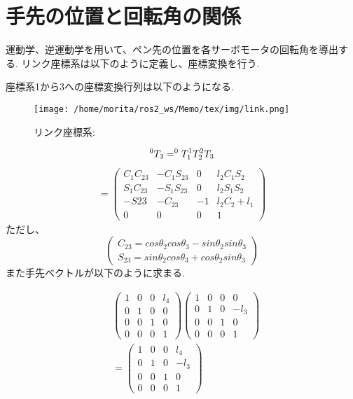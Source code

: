 \documentclass[10pt]{jarticle}
\begin{document}
	\section{手先の位置と回転角の関係}
	運動学、逆運動学を用いて、ペン先の位置を各サーボモータの回転角を導出する.
	リンク座標系は以下のように定義し、座標変換を行う.
	
	座標系1から3への座標変換行列は以下のようになる.
    \begin{center}
        \begin{figure}[!b]
            \texttt{[image: /home/morita/ros2\_ws/Memo/tex/img/link.png]}
            \caption{リンク座標系:}
            \label{fig:sample-fig}
        \end{figure}
    \end{center}
$$
	^{0}T_{3}=^{0}T_{1} ^{1}T_{2} ^{2}T_{3} \\
$$
	\begin{equation*}
		\begin{array}{cc}
			=
			\left( 
				\begin{array}{cccc}
					C_1C_{23} & -C_1S_{23} & 0 & l_2C_1S_2 \\
					S_1C_{23} & -S_1S_{23} & 0 & l_2S_1S_2 \\
					-S{23} & -C_{23} & -1 & l_2C_2 + l_1 \\
					0 & 0 & 0 & 1 
				\end{array}
			\right)
		\end{array}
	\end{equation*}
	ただし、
	\begin{equation*}
		\left(
		\begin{split}
			C_{23} = cos\theta_2cos\theta_3-sin\theta_2sin\theta_3\\
			S_{23} = sin\theta_2cos\theta_3+cos\theta_2sin\theta_3	
		\end{split}
		\right)
	\end{equation*}
    また手先ベクトルが以下のように求まる.

	\begin{equation*}
	\begin{array}{cccc}
		&\left(
			\begin{array}{cccc}
				1 & 0 & 0 & l_4\\
				0 & 1 & 0 & 0\\
				0 & 0 & 1 & 0\\
				0 & 0 & 0 & 1
			\end{array}
		\right)
		\left(
			\begin{array}{cccc}
				1 & 0 & 0 & 0\\
				0 & 1 & 0 & -l_3\\
				0 & 0 & 1 & 0\\
				0 & 0 & 0 & 1
			\end{array}
			\right)\\
		&=
		\left(
		\begin{array}{cccc}
			1 & 0 & 0 & l_4\\
			0 & 1 & 0 & -l_3\\
			0 & 0 & 1 & 0\\
			0 & 0 & 0 & 1
		\end{array}
		\right)
	\end{array}
	\end{equation*}
	
\end{document}

